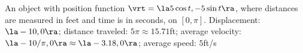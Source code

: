 {An object with position function $\vrt = \la 5\cos t,-5\sin t\ra$, where distances are measured in feet and time is in seconds, on $[0,\pi]$.
}
{Displacement: $\la -10,0\ra$; distance traveled: $5\pi \approx 15.71$ft; average velocity: $\la -10/\pi,0\ra\approx \la -3.18,0\ra$; average speed: $5$ft/s
}